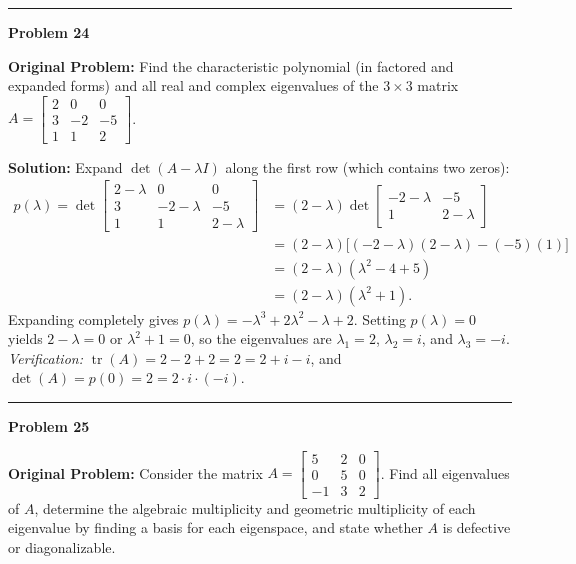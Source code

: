 \documentclass[11pt, letterpaper]{article}
\theoremstyle{definition}
\theoremstyle{remark}
\begin{document}
\noindent\rule{\textwidth}{0.4pt}

\noindent\textbf{Problem 24}

\textbf{Original Problem:} Find the characteristic polynomial (in factored and expanded forms) and all real and complex eigenvalues of the $3 \times 3$ matrix $A = \begin{bmatrix} 2 & 0 & 0 \\ 3 & -2 & -5 \\ 1 & 1 & 2 \end{bmatrix}$.

\textbf{Solution:} Expand $\det(A - \lambda I)$ along the first row (which contains two zeros):
\begin{align*}
p(\lambda) = \det\begin{bmatrix} 2 - \lambda & 0 & 0 \\ 3 & -2 - \lambda & -5 \\ 1 & 1 & 2 - \lambda \end{bmatrix} &= (2 - \lambda)\det\begin{bmatrix} -2 - \lambda & -5 \\ 1 & 2 - \lambda \end{bmatrix} \\
&= (2 - \lambda)\big[(-2 - \lambda)(2 - \lambda) - (-5)(1)\big] \\
&= (2 - \lambda)(\lambda^2 - 4 + 5) \\
&= (2 - \lambda)(\lambda^2 + 1).
\end{align*}
Expanding completely gives $p(\lambda) = -\lambda^3 + 2\lambda^2 - \lambda + 2$.
Setting $p(\lambda) = 0$ yields $2 - \lambda = 0$ or $\lambda^2 + 1 = 0$, so the eigenvalues are $\lambda_1 = 2$, $\lambda_2 = i$, and $\lambda_3 = -i$.
\textit{Verification:} $\operatorname{tr}(A) = 2 - 2 + 2 = 2 = 2 + i - i$, and $\det(A) = p(0) = 2 = 2 \cdot i \cdot (-i)$.

\noindent\rule{\textwidth}{0.4pt}

\noindent\textbf{Problem 25}

\textbf{Original Problem:} Consider the matrix $A = \begin{bmatrix} 5 & 2 & 0 \\ 0 & 5 & 0 \\ -1 & 3 & 2 \end{bmatrix}$. Find all eigenvalues of $A$, determine the algebraic multiplicity and geometric multiplicity of each eigenvalue by finding a basis for each eigenspace, and state whether $A$ is defective or diagonalizable.
\end{document}
